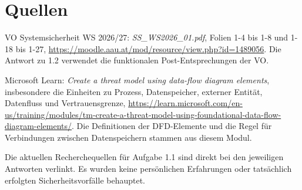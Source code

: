 \documentclass[a4paper,11pt]{article}
\begin{document}
\section*{Quellen}
VO Systemsicherheit WS 2026/27: \emph{SS\_WS2026\_01.pdf}, Folien 1-4 bis 1-8 und 1-18 bis 1-27,
\url{https://moodle.aau.at/mod/resource/view.php?id=1489056}.
Die Antwort zu 1.2 verwendet die funktionalen Post-Entsprechungen der VO.

Microsoft Learn: \emph{Create a threat model using data-flow diagram elements},
insbesondere die Einheiten zu Prozess, Datenspeicher, externer Entität, Datenfluss und Vertrauensgrenze,
\url{https://learn.microsoft.com/en-us/training/modules/tm-create-a-threat-model-using-foundational-data-flow-diagram-elements/}.
Die Definitionen der DFD-Elemente und die Regel für Verbindungen zwischen Datenspeichern stammen aus diesem Modul.

Die aktuellen Recherchequellen für Aufgabe 1.1 sind direkt bei den jeweiligen Antworten verlinkt.
Es wurden keine persönlichen Erfahrungen oder tatsächlich erfolgten Sicherheitsvorfälle behauptet.
\end{document}
